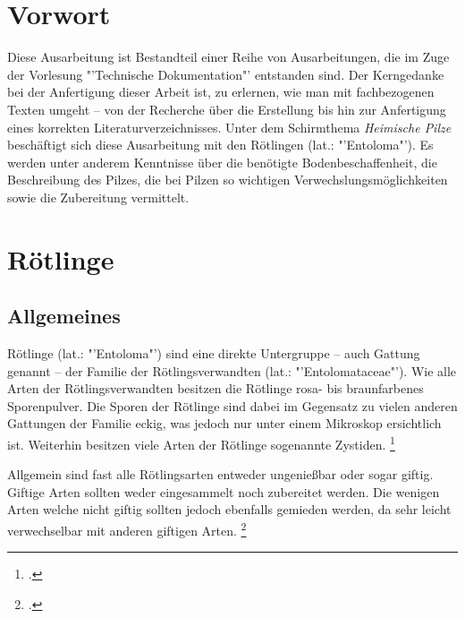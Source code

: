\documentclass[a4paper,abstracton]{scrreprt}
\begin{document}


\tableofcontents

\begin{abstract}
\begin{quote}%
Diese Arbeit befasst sich mit Pizlen und so nem kram. kein scheiss
\end{quote} 
\end{abstract}

\chapter{Vorwort}
Diese Ausarbeitung ist Bestandteil einer Reihe von Ausarbeitungen, die im Zuge der Vorlesung "'Technische Dokumentation"' entstanden sind. Der Kerngedanke bei der Anfertigung dieser Arbeit ist, zu erlernen, wie man mit fachbezogenen Texten umgeht -- von der Recherche über die Erstellung bis hin zur Anfertigung eines korrekten Literaturverzeichnisses. Unter dem Schirmthema \emph{Heimische Pilze} beschäftigt sich diese Ausarbeitung mit den Rötlingen (lat.: "'Entoloma"'). Es werden unter anderem Kenntnisse über die benötigte Bodenbeschaffenheit, die Beschreibung des Pilzes, die bei Pilzen so wichtigen Verwechslungsmöglichkeiten sowie die Zubereitung vermittelt.
\chapter{Rötlinge}
\section{Allgemeines}
Rötlinge (lat.: "'Entoloma"') sind eine direkte Untergruppe -- auch Gattung genannt -- der Familie der Rötlingsverwandten (lat.: "'Entolomataceae"'). Wie alle Arten der Rötlingsverwandten besitzen die Rötlinge rosa- bis braunfarbenes Sporenpulver. Die Sporen der Rötlinge sind dabei im Gegensatz zu vielen anderen Gattungen der Familie eckig, was jedoch nur unter einem Mikroskop ersichtlich ist. Weiterhin besitzen viele Arten der Rötlinge sogenannte Zystiden. \footcite{entoloma}

Allgemein sind fast alle Rötlingsarten entweder ungenießbar oder sogar giftig. Giftige Arten sollten weder eingesammelt noch zubereitet werden. Die wenigen Arten welche nicht giftig sollten jedoch ebenfalls gemieden werden, da sehr leicht verwechselbar mit anderen giftigen Arten. \footcite{kosmos}
\end{document}
